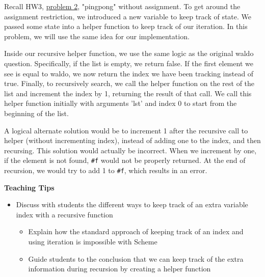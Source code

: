 \begin{blocksection}
\begin{solution}
Recall HW3, \href{https://cs61a.org/hw/hw03/#q2}{problem 2}, "pingpong" without assignment. To get around the assignment restriction, we introduced a new variable to keep track of state. We passed some state into a helper function to keep track of our iteration. In this problem, we will use the same idea for our implementation.

Inside our recursive helper function, we use the same logic as the original waldo question. Specifically, if the list is empty, we return false. If the first element we see is equal to waldo, we now return the index we have been tracking instead of true. Finally, to recursively search, we call the helper function on the rest of the list and increment the index by 1, returning the result of that call. We call this helper function initially with arguments 'lst' and index 0 to start from the beginning of the list.

A logical alternate solution would be to increment 1 after the recursive call to helper (without incrementing index), instead of adding one to the index, and then recursing. This solution would actually be incorrect. When we increment by one, if the element is not found, \texttt{\#f} would not be properly returned. At the end of recursion, we would try to add 1 to \texttt{\#f}, which results in an error.
\end{solution}

\end{blocksection}

\begin{guide}
\begin{blocksection}
\textbf{Teaching Tips}
\begin{itemize}
  \item Discuss with students the different ways to keep track of an extra variable index with a recursive function
  \begin{itemize}
    \item Explain how the standard approach of keeping track of an index and using iteration is impossible with Scheme
    \item Guide students to the conclusion that we can keep track of the extra information during recursion by creating a helper function
  \end{itemize}
\end{itemize}
\end{blocksection}
\end{guide}
